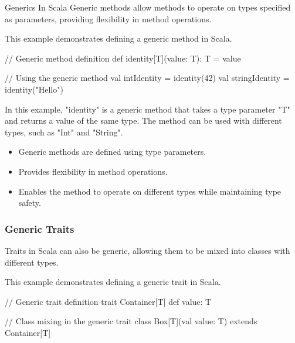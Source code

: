 \begin{notes}{Generics In Scala}
    Generic methods allow methods to operate on types specified as parameters, providing flexibility in method operations.
    
    \begin{highlight}
    
        This example demonstrates defining a generic method in Scala.
    
    \begin{code}[Scala]
    // Generic method definition
    def identity[T](value: T): T = value
    
    // Using the generic method
    val intIdentity = identity(42)
    val stringIdentity = identity("Hello")
    \end{code}
    
        In this example, "identity" is a generic method that takes a type parameter "T" and returns a value of the same type. The method can be used with different types, such as "Int" and "String".
    
        \begin{itemize}
            \item Generic methods are defined using type parameters.
            \item Provides flexibility in method operations.
            \item Enables the method to operate on different types while maintaining type safety.
        \end{itemize}
    
    \end{highlight}
    
    \subsubsection*{Generic Traits}
    
    Traits in Scala can also be generic, allowing them to be mixed into classes with different types.
    
    \begin{highlight}
    
        This example demonstrates defining a generic trait in Scala.
    
    \begin{code}[Scala]
    // Generic trait definition
    trait Container[T] {
        def value: T
    }
    
    // Class mixing in the generic trait
    class Box[T](val value: T) extends Container[T]
    

\end{code}
\end{highlight}
\end{notes}
